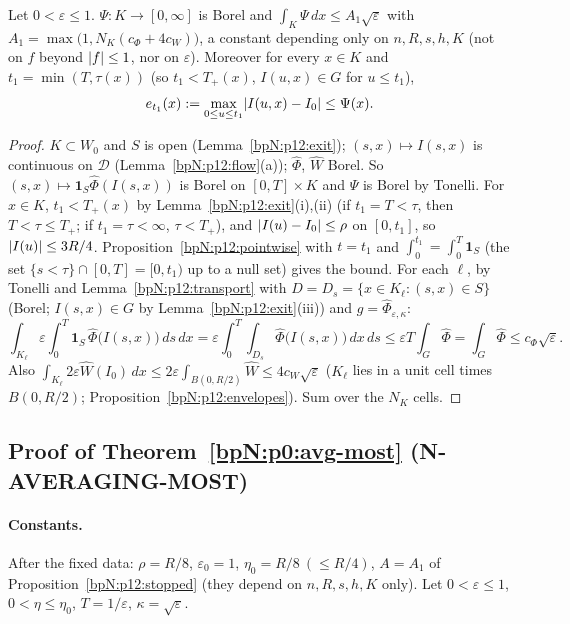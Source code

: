 \begin{proposition}\label{bpN:p12:stopped}
Let $0<\varepsilon\le1$. $\Psi:K\to[0,\infty]$ is Borel and $\int_K\Psi\,dx\le A_1\sqrt\varepsilon$ with $A_1=\max\bigl(1,N_K(c_\Phi+4c_W)\bigr)$, a constant depending only on $n,R,s,h,K$ (not on $f$ beyond $\lvert f\rvert\le1$, nor on $\varepsilon$). Moreover for every $x\in K$ and $t_1=\min(T,\tau(x))$ (so $t_1<T_+(x)$, $I(u,x)\in G$ for $u\le t_1$),
\[e_{t_1}(x):=\max_{0\le u\le t_1}\lvert I(u,x)-I_0\rvert\le\Psi(x).\]
\end{proposition}
\begin{proof}
\label{stepN:p12:st-meas} $K\subset W_0$ and $S$ is open (Lemma~\ref{bpN:p12:exit}); $(s,x)\mapsto I(s,x)$ is continuous on $\mathcal D$ (Lemma~\ref{bpN:p12:flow}(a)); $\widehat\Phi$, $\widehat W$ Borel. So $(s,x)\mapsto\mathbf 1_S\widehat\Phi(I(s,x))$ is Borel on $[0,T]\times K$ and $\Psi$ is Borel by Tonelli.
\label{stepN:p12:st-pt} For $x\in K$, $t_1<T_+(x)$ by Lemma~\ref{bpN:p12:exit}(i),(ii) (if $t_1=T<\tau$, then $T<\tau\le T_+$; if $t_1=\tau<\infty$, $\tau<T_+$), and $\lvert I(u)-I_0\rvert\le\rho$ on $[0,t_1]$, so $\lvert I(u)\rvert\le3R/4$. Proposition~\ref{bpN:p12:pointwise} with $t=t_1$ and $\int_0^{t_1}=\int_0^T\mathbf 1_S$ (the set $\{s<\tau\}\cap[0,T]=[0,t_1)$ up to a null set) gives the bound.
\label{stepN:p12:st-int} For each $\ell$, by Tonelli and Lemma~\ref{bpN:p12:transport} with $D=D_s=\{x\in K_\ell:(s,x)\in S\}$ (Borel; $I(s,x)\in G$ by Lemma~\ref{bpN:p12:exit}(iii)) and $g=\widehat\Phi_{\varepsilon,\kappa}$:
\[\int_{K_\ell}\varepsilon\int_0^T\mathbf 1_S\,\widehat\Phi\bigl(I(s,x)\bigr)\,ds\,dx=\varepsilon\int_0^T\int_{D_s}\widehat\Phi\bigl(I(s,x)\bigr)\,dx\,ds\le\varepsilon T\int_G\widehat\Phi=\int_G\widehat\Phi\le c_\Phi\sqrt\varepsilon .\]
Also $\int_{K_\ell}2\varepsilon\widehat W(I_0)\,dx\le2\varepsilon\int_{B(0,R/2)}\widehat W\le4c_W\sqrt\varepsilon$ ($K_\ell$ lies in a unit cell times $B(0,R/2)$; Proposition~\ref{bpN:p12:envelopes}). Sum over the $N_K$ cells.
\end{proof}

\subsection{Proof of Theorem~\ref{bpN:p0:avg-most} (N-AVERAGING-MOST)}\label{bpN:p12:s-most}

\paragraph{Constants.} After the fixed data: $\rho=R/8$, $\varepsilon_0=1$, $\eta_0=R/8\ (\le R/4)$, $A=A_1$ of Proposition~\ref{bpN:p12:stopped} (they depend on $n,R,s,h,K$ only). Let $0<\varepsilon\le1$, $0<\eta\le\eta_0$, $T=1/\varepsilon$, $\kappa=\sqrt\varepsilon$.

